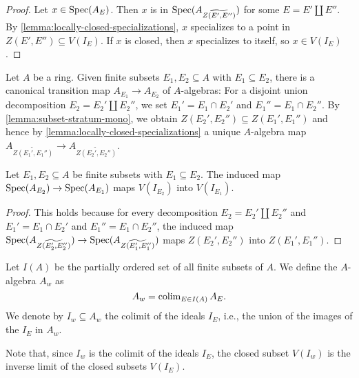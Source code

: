 \begin{proof}
    Let $x \in \mathrm{Spec}(A_E)$. Then $x$ is in $\mathrm{Spec}(A_{\widetilde{Z(E', E'')}})$ for some
    $E = E' \coprod E''$. By
    \ref{lemma:locally-closed-specializations}, $x$ specializes to a point
    in $Z(E', E'') \subseteq V(I_E)$.
    If $x$ is closed, then $x$ specializes to itself, so $x \in V(I_E)$.
\end{proof}

Let $A$ be a ring. Given finite subsets $E_1, E_2 \subseteq A$ with $E_1 \subseteq E_2$, there is a
canonical transition map $A_{E_1} \to A_{E_2}$ of $A$-algebras: For
a disjoint union decomposition $E_2 = E_2' \coprod E_2''$, we set
$E_1' = E_1 \cap E_2'$ and $E_1'' = E_1 \cap E_2''$. By \ref{lemma:subset-stratum-mono},
we obtain $Z(E_2', E_2'') \subseteq Z(E_1', E_1'')$ and hence
by \ref{lemma:locally-closed-specializations} a unique $A$-algebra map
$A_{\widetilde{Z(E_1', E_1'')}} \to A_{\widetilde{Z(E_2', E_2'')}}$.

\begin{lemma}
    Let $E_1, E_2 \subseteq A$ be finite subsets with $E_1 \subseteq E_2$.
    The induced map $\mathrm{Spec}(A_{E_2}) \to \mathrm{Spec}(A_{E_1})$ maps
    $V(I_{E_2})$ into $V(I_{E_1})$.
    \label{lemma:finite-stratification-map-closed}
\end{lemma}

\begin{proof}
    This holds because for every decomposition $E_2 = E_2' \coprod E_2''$
    and $E_1' = E_1 \cap E_2'$ and $E_1'' = E_1 \cap E_2''$, the induced map
    $\mathrm{Spec}(A_{\widetilde{Z(E_2', E_2'')}}) \to \mathrm{Spec}(A_{\widetilde{Z(E_1', E_1'')}})$
    maps $Z(E_2', E_2'')$ into $Z(E_1', E_1'')$.
\end{proof}

\begin{definition}
    Let $I(A)$ be the partially ordered set of all finite subsets of $A$. We define the
    $A$-algebra $A_{w}$ as
    \[
    A_w = \operatorname{colim}_{E \in I(A)} A_E
    .\]
    We denote by $I_w \subseteq A_w$ the colimit of the ideals $I_E$, i.e.,
    the union of the images of the $I_E$ in $A_w$.%
    \label{def:w-localization}
\end{definition}

Note that, since $I_w$ is the colimit of the ideals $I_E$, the closed subset
$V(I_w)$ is the inverse limit of the closed subsets $V(I_E)$.

